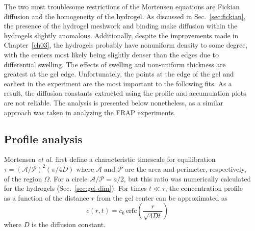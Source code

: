 The two most troublesome restrictions of the Mortensen equations are Fickian diffusion and the homogeneity of the hydrogel.  As discussed in Sec.~\ref{sec:fickian}, the presence of the hydrogel meshwork and binding make diffusion within the hydrogels slightly anomalous.  Additionally, despite the improvements made in Chapter~\ref{ch03}, the hydrogels probably have nonuniform density to some degree, with the centers most likely being slightly denser than the edges due to differential swelling.  The effects of swelling and non-uniform thickness are greatest at the gel edge.  Unfortunately, the points at the edge of the gel and earliest in the experiment are the most important to the following fits.  As a result, the diffusion constants extracted using the profile and accumulation plots are not reliable.  The analysis is presented below nonetheless, as a similar approach was taken in analyzing the FRAP experiments.

\subsection{Profile analysis}
\label{sec:profile-analysis}

Mortensen \textit{et al.} first define a characteristic timescale for equilibration $\tau = (\mathcal{A}/\mathcal{P})^2 (\pi/4D)$ where $\mathcal{A}$ and $\mathcal{P}$ are the area and perimeter, respectively, of the region $\Omega$.  For a circle $\mathcal{A}/\mathcal{P} = a/2$, but this ratio was numerically calculated for the hydrogels (Sec.~\ref{sec:gel-dim}).  For times $t \ll \tau$, the concentration profile as a function of the distance $r$ from the gel center can be approximated as 
\begin{equation}
c(r,t) = c_0 \,\mathrm{erfc}\left(\frac{r}{\sqrt{4Dt}}\right)
\label{eq:approx-profile}
\end{equation}
where $D$ is the diffusion constant.


